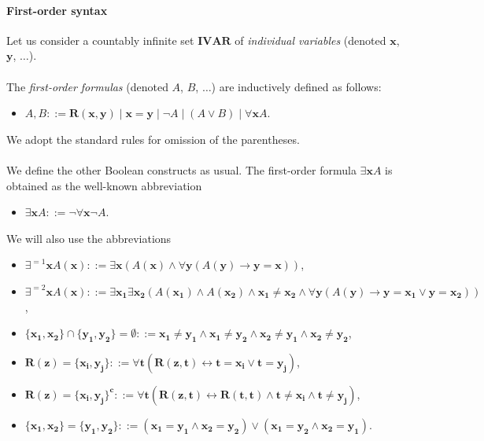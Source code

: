 \documentclass[draft]{article}
\def\IVAR{\mathbf{IVAR}}
\begin{document}
\paragraph{First-order syntax}
%
%
Let us consider a countably infinite set $\IVAR$ of {\it individual variables}\/ (denoted $\mathbf{x}$, $\mathbf{y}$, $\ldots$).
%
%
\\
\\
%
%
The {\it first-order formulas}\/ (denoted $A$, $B$, $\ldots$) are inductively defined as follows:
%
%
\begin{itemize}
%
%
\item $A,B::=\mathbf{R}(\mathbf{x},\mathbf{y})\mid\mathbf{x}{=}\mathbf{y}\mid\neg A\mid(A\vee B)\mid\forall\mathbf{x}A$.
%
%
\end{itemize}
%
%
We adopt the standard rules for omission of the parentheses.
%
%
\\
\\
%
%
We define the other Boolean constructs as usual.
The first-order formula $\exists\mathbf{x}A$ is obtained as the well-known abbreviation
%
%
\begin{itemize}
%
%
\item $\exists\mathbf{x}A::=\neg\forall\mathbf{x}\neg A$.
%
%
\end{itemize}
%
%
We will also use the abbreviations
%
%
\begin{itemize}
%
%
\item $\exists^{{=}1}\mathbf{x}A(\mathbf{x})::=\exists\mathbf{x}(A(\mathbf{x})\wedge\forall\mathbf{y}(A(\mathbf{y})\rightarrow\mathbf{y}{=}\mathbf{x}))$,
%
%
\item $\exists^{{=}2}\mathbf{x}A(\mathbf{x})::=\exists\mathbf{x_{1}}\exists\mathbf{x_{2}}(A(\mathbf{x_{1}})\wedge A(\mathbf{x_{2}})\wedge\mathbf{x_{1}}{\not=}\mathbf{x_{2}}\wedge\forall\mathbf{y}(A(\mathbf{y})\rightarrow\mathbf{y}{=}\mathbf{x_{1}}\vee\mathbf{y}{=}\mathbf{x_{2}}))$,
%
%
\item $\{\mathbf{x_{1}},\mathbf{x_{2}}\}{\cap}\{\mathbf{y_{1}},\mathbf{y_{2}}\}{=}\emptyset::=\mathbf{x_{1}}{\not=}\mathbf{y_{1}}\wedge\mathbf{x_{1}}{\not=}\mathbf{y_{2}}\wedge\mathbf{x_{2}}{\not=}\mathbf{y_{1}}\wedge\mathbf{x_{2}}{\not=}\mathbf{y_{2}}$,
%
%
\item $\mathbf{R}(\mathbf{z}){=}\{\mathbf{x_{i}},\mathbf{y_{j}}\}::=\forall\mathbf{t}(\mathbf{R}(\mathbf{z},\mathbf{t})\leftrightarrow\mathbf{t}{=}\mathbf{x_{i}}\vee\mathbf{t}{=}\mathbf{y_{j}})$,
%
%
\item $\mathbf{R}(\mathbf{z}){=}\{\mathbf{x_{i}},\mathbf{y_{j}}\}^{\mathbf{c}}::=\forall\mathbf{t}(\mathbf{R}(\mathbf{z},\mathbf{t})\leftrightarrow\mathbf{R}(\mathbf{t},\mathbf{t})\wedge\mathbf{t}{\not=}\mathbf{x_{i}}\wedge\mathbf{t}{\not=}\mathbf{y_{j}})$,
%
%
\item $\{\mathbf{x_{1}},\mathbf{x_{2}}\}{=}\{\mathbf{y_{1}},\mathbf{y_{2}}\}::=(\mathbf{x_{1}}{=}\mathbf{y_{1}}\wedge\mathbf{x_{2}}{=}\mathbf{y_{2}})\vee(\mathbf{x_{1}}{=}\mathbf{y_{2}}\wedge\mathbf{x_{2}}{=}\mathbf{y_{1}})$.
%
%
\end{itemize}
\end{document}
